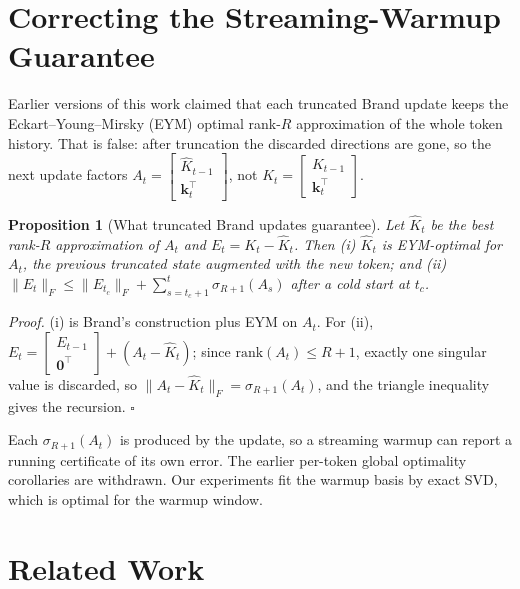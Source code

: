 \documentclass{article}
\newtheorem{proposition}{Proposition}
\begin{document}
\section{Correcting the Streaming-Warmup Guarantee}
\label{sec:theory}

Earlier versions of this work claimed that each truncated Brand update
\citep{brand2006} keeps the Eckart--Young--Mirsky (EYM) optimal rank-$R$
approximation of the whole token history. That is false: after truncation
the discarded directions are gone, so the next update factors
$A_t = \begin{bmatrix}\hat K_{t-1}\\ \mathbf{k}_t^\top\end{bmatrix}$, not
$K_t = \begin{bmatrix}K_{t-1}\\ \mathbf{k}_t^\top\end{bmatrix}$.

\begin{proposition}[What truncated Brand updates guarantee]
\label{prop:brand}
Let $\hat K_t$ be the best rank-$R$ approximation of $A_t$ and
$E_t = K_t - \hat K_t$. Then (i) $\hat K_t$ is EYM-optimal for $A_t$, the
previous truncated state augmented with the new token; and (ii)
$\lVert E_t\rVert_F \le \lVert E_{t_c}\rVert_F + \sum_{s=t_c+1}^{t}\sigma_{R+1}(A_s)$
after a cold start at $t_c$.
\end{proposition}

\emph{Proof.} (i) is Brand's construction plus EYM on $A_t$. For (ii),
$E_t = \begin{bmatrix}E_{t-1}\\ \mathbf{0}^\top\end{bmatrix} + (A_t - \hat K_t)$; since
$\mathrm{rank}(A_t)\le R{+}1$, exactly one singular value is discarded, so
$\lVert A_t - \hat K_t\rVert_F = \sigma_{R+1}(A_t)$, and the triangle
inequality gives the recursion. \hfill$\square$

Each $\sigma_{R+1}(A_t)$ is produced by the update, so a streaming warmup can
report a running certificate of its own error. The earlier per-token global
optimality corollaries are withdrawn. Our experiments fit the warmup basis by
exact SVD, which is optimal for the warmup window.

\section{Related Work}
\label{sec:related}
\end{document}
